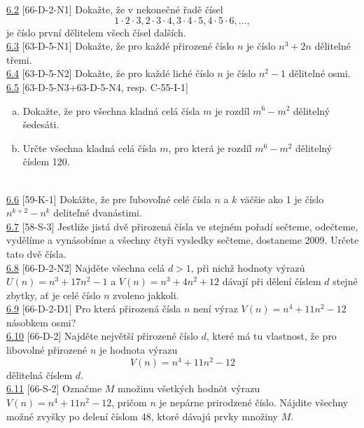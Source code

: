 \noindent \ul{6.2} [66-D-2-N1] Dokažte, že v nekonečné řadě čísel
$$ 1 \cdot 2 \cdot 3, 2 \cdot 3 \cdot 4, 3 \cdot 4 \cdot 5, 4 \cdot 5 \cdot 6, \ldots ,$$
je číslo první dělitelem všech čísel dalších.\\

\noindent \ul{6.3} [63-D-5-N1] Dokažte, že pro každé přirozené číslo $n$ je číslo
$n^3+ 2n$ dělitelné třemi.\\

\noindent \ul{6.4} [63-D-5-N2] Dokažte, že pro každé liché číslo $n$ je číslo
$n^2 - 1$ dělitelné osmi.\\

\noindent \ul{6.5} [63-D-5-N3+63-D-5-N4, resp. C-55-I-1] \begin{enumerate}[a)]
\item Dokažte, že pro všechna kladná celá čísla $m$ je rozdíl $m^6 - m^2$ dělitelný šedesáti.
\item Určte všechna kladná celá čísla $m$, pro která je rozdíl $m^6 - m^2$ dělitelný číslem 120.
\end{enumerate}\\

\noindent \ul{6.6} [59-K-1]
Dokážte, že pre ľubovoľné celé čísla $n$ a $k$ väčšie ako 1 je číslo $n^{k+2} - n^k$ deliteľné dvanástimi.\\

\noindent \ul{6.7} [58-S-3] Jestliže jistá dvě přirozená čísla ve stejném pořadí sečteme, odečteme,
vydělíme a vynásobíme a všechny čtyři vysledky sečteme, dostaneme 2009. Určete tato dvě čísla.\\

\noindent \ul{6.8} [66-D-2-N2] Najděte všechna celá $d > 1$, při nichž hodnoty výrazů $U(n) = n^3+
17n^2-1$ a $V (n) = n^3+ 4n^2+ 12$ dávají při dělení číslem $d$ stejné zbytky, ať je celé číslo
$n$ zvoleno jakkoli.\\

\noindent \ul{6.9} [66-D-2-D1] Pro která přirozená čísla $n$ není výraz $V (n) = n^4+ 11n^2 - 12$ násobkem osmi?\\

\noindent \ul{6.10} [66-D-2]
Najděte největší přirozené číslo $d$, které má tu vlastnost, že pro libovolné přirozené $n$ je hodnota výrazu $$V (n) = n^4+ 11n^2-12$$
dělitelná číslem $d$.\\

\noindent \ul{6.11} [66-S-2]
Označme $M$ množinu všetkých hodnôt výrazu $V (n) = n^4 + 11n^2 - 12$, pričom $n$ je nepárne prirodzené číslo. Nájdite všechny možné zvyšky po delení číslom 48, ktoré dávajú prvky množiny $M$.\\

